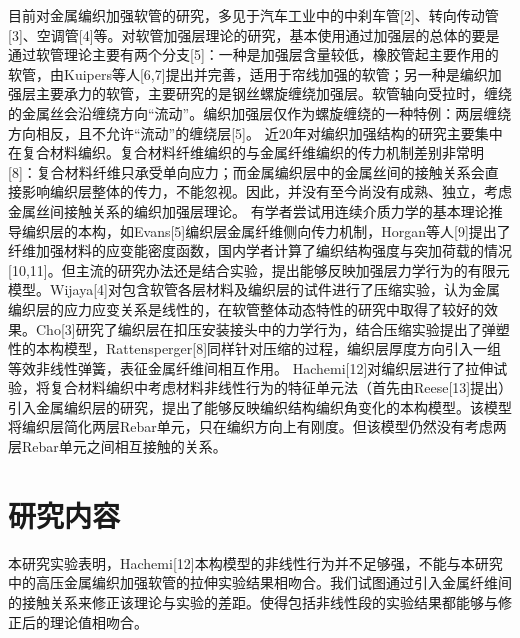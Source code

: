 目前对金属编织加强软管的研究，多见于汽车工业中的中刹车管[2]、转向传动管[3]、空调管[4]等。对软管加强层理论的研究，基本使用通过加强层的总体的要是通过软管理论主要有两个分支[5]：一种是加强层含量较低，橡胶管起主要作用的软管，由Kuipers等人[6,7]提出并完善，适用于帘线加强的软管；另一种是编织加强层主要承力的软管，主要研究的是钢丝螺旋缠绕加强层。软管轴向受拉时，缠绕的金属丝会沿缠绕方向“流动”。编织加强层仅作为螺旋缠绕的一种特例：两层缠绕方向相反，且不允许“流动”的缠绕层[5]。
近20年对编织加强结构的研究主要集中在复合材料编织。复合材料纤维编织的与金属纤维编织的传力机制差别非常明[8]：复合材料纤维只承受单向应力；而金属编织层中的金属丝间的接触关系会直接影响编织层整体的传力，不能忽视。因此，并没有至今尚没有成熟、独立，考虑金属丝间接触关系的编织加强层理论。
有学者尝试用连续介质力学的基本理论推导编织层的本构，如Evans[5]编织层金属纤维侧向传力机制，Horgan等人[9]提出了纤维加强材料的应变能密度函数，国内学者计算了编织结构强度与突加荷载的情况[10,11]。但主流的研究办法还是结合实验，提出能够反映加强层力学行为的有限元模型。Wijaya[4]对包含软管各层材料及编织层的试件进行了压缩实验，认为金属编织层的应力应变关系是线性的，在软管整体动态特性的研究中取得了较好的效果。Cho[3]研究了编织层在扣压安装接头中的力学行为，结合压缩实验提出了弹塑性的本构模型，Rattensperger[8]同样针对压缩的过程，编织层厚度方向引入一组等效非线性弹簧，表征金属纤维间相互作用。
Hachemi[12]对编织层进行了拉伸试验，将复合材料编织中考虑材料非线性行为的特征单元法（首先由Reese[13]提出）引入金属编织层的研究，提出了能够反映编织结构编织角变化的本构模型。该模型将编织层简化两层Rebar单元，只在编织方向上有刚度。但该模型仍然没有考虑两层Rebar单元之间相互接触的关系。

\section{研究内容}
本研究实验表明，Hachemi[12]本构模型的非线性行为并不足够强，不能与本研究中的高压金属编织加强软管的拉伸实验结果相吻合。我们试图通过引入金属纤维间的接触关系来修正该理论与实验的差距。使得包括非线性段的实验结果都能够与修正后的理论值相吻合。
 
